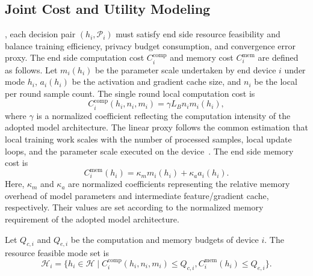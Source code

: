 ﻿\documentclass[preprint,12pt]{elsarticle}
\theoremstyle{plain}
\theoremstyle{definition}
\theoremstyle{remark}
\begin{document}
\subsection{Joint Cost and Utility Modeling}
\label{sec:cost_utility_model}
, each decision pair \((h_i,\mathcal{P}_i)\) must satisfy end side resource feasibility and balance training efficiency, privacy budget consumption, and convergence error proxy.
The end side computation cost \(C_i^{\mathrm{comp}}\) and memory cost \(C_i^{\mathrm{mem}}\) are defined as follows.
Let \(m_i(h_i)\) be the parameter scale undertaken by end device \(i\) under mode \(h_i\), \(a_i(h_i)\) be the activation and gradient cache size, and \(n_i\) be the local per round sample count.
The single round local computation cost is
\begin{equation}
    C_i^{\mathrm{comp}}(h_i,n_i,m_i)=\gamma L_B n_i m_i(h_i),
\end{equation}
where \(\gamma\) is a normalized coefficient reflecting the computation intensity of the adopted model architecture. The linear proxy follows the common estimation that local training work scales with the number of processed samples, local update loops, and the parameter scale executed on the device~\cite{fedavg,wang2019adaptivefl}.
The end side memory cost is
\begin{equation}
    C_i^{\mathrm{mem}}(h_i)=\kappa_m m_i(h_i)+\kappa_a a_i(h_i).
\end{equation}
Here, \(\kappa_m\) and \(\kappa_a\) are normalized coefficients representing the relative memory overhead of model parameters and intermediate feature/gradient cache, respectively. Their values are set according to the normalized memory requirement of the adopted model architecture.

Let \(Q_{c,i}\) and \(Q_{e,i}\) be the computation and memory budgets of device \(i\).
The resource feasible mode set is
\begin{equation}
    \mathcal{H}_i=
    \{h_i\in\mathcal{H}\mid
    C_i^{\mathrm{comp}}(h_i,n_i,m_i)\le Q_{c,i},
    C_i^{\mathrm{mem}}(h_i)\le Q_{e,i}\}.
\label{eq:resource_feasible}
\end{equation}
\end{document}
